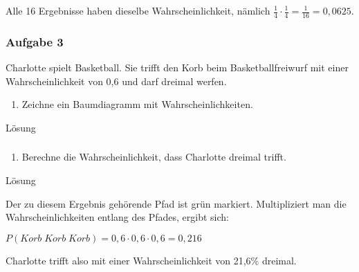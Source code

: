 \documentclass[
  ngerman,
]{book}
\providecommand{\tightlist}{%
  \setlength{\itemsep}{0pt}\setlength{\parskip}{0pt}}
\begin{document}
Alle 16 Ergebnisse haben dieselbe Wahrscheinlichkeit, nämlich \(\frac{1}{4}\cdot\frac{1}{4}=\frac{1}{16}=0,0625\).

\hypertarget{section-117}{%
\subsubsection*{}\label{section-117}}

\hypertarget{aufgabe-3-6}{%
\subsubsection*{Aufgabe 3}\label{aufgabe-3-6}}

Charlotte spielt Basketball. Sie trifft den Korb beim Basketballfreiwurf mit einer Wahrscheinlichkeit von 0,6 und darf dreimal werfen.

\begin{enumerate}
\def\labelenumi{\alph{enumi})}
\tightlist
\item
  Zeichne ein Baumdiagramm mit Wahrscheinlichkeiten.
\end{enumerate}

Lösung

\hypertarget{section-118}{%
\subsubsection*{}\label{section-118}}

\begin{enumerate}
\def\labelenumi{\alph{enumi})}
\setcounter{enumi}{1}
\tightlist
\item
  Berechne die Wahrscheinlichkeit, dass Charlotte dreimal trifft.
\end{enumerate}

Lösung

Der zu diesem Ergebnis gehörende Pfad ist grün markiert. Multipliziert man die Wahrscheinlichkeiten entlang des Pfades, ergibt sich:

\(P(Korb\;Korb\;Korb)=0,6\cdot0,6\cdot0,6=0,216\)

Charlotte trifft also mit einer Wahrscheinlichkeit von 21,6\% dreimal.

\hypertarget{section-119}{%
\subsubsection*{}\label{section-119}}
\end{document}
